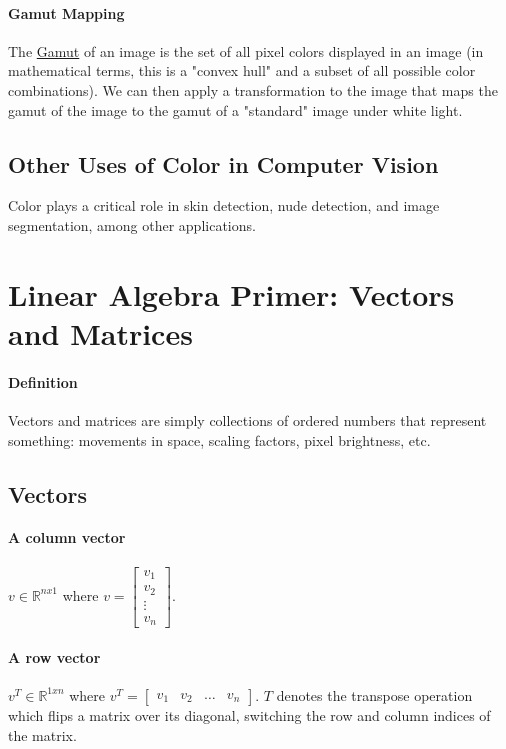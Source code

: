 \documentclass{article}
\begin{document}
\paragraph{Gamut Mapping} The \href{https://en.wikipedia.org/wiki/Gamut}{Gamut} of an image is the set of all pixel colors displayed in an image (in mathematical terms, this is a "convex hull" and a subset of all possible color combinations).  We can then apply a transformation to the image that maps the gamut of the image to the gamut of a "standard" image under white light.

\subsection{Other Uses of Color in Computer Vision}
Color plays a critical role in skin detection, nude detection, and image segmentation, among other applications.




\section{Linear Algebra Primer: Vectors and Matrices}
\paragraph{Definition} Vectors and matrices are simply collections of ordered numbers that represent something: movements in space, scaling factors, pixel brightness, etc.

\subsection{Vectors}
\paragraph{A column vector} $v\in \mathbb{R}^{nx1}$ where
 $v = \begin{bmatrix}
      	v_{1} \\
        v_{2} \\
        \vdots \\
        v_{n}
       \end{bmatrix}$.
\paragraph{A row vector} $v^{T}\in \mathbb{R}^{1xn}$ where $v^{T} = \begin{bmatrix}
v_{1} & v_{2} & \dots & v_{n} \end{bmatrix}$. $T$ denotes the transpose operation which flips a matrix over its diagonal, switching the row and column indices of the matrix.
\end{document}
